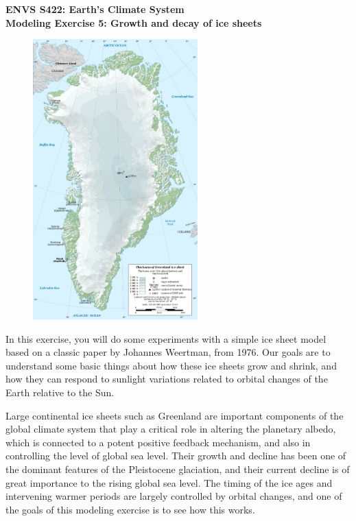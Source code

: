 \documentclass[11pt,letterpaper]{article}
\begin{document}
\setlength{\parindent}{0in}
\newcommand{\tablespace}[0]{\vspace{8pt}}
\textbf{ENVS S422: Earth's Climate System\\
Modeling Exercise 5: Growth and decay of ice sheets}\\%

\begin{figure}
\includegraphics[width=2.5in]{./greenland.png}
\end{figure}
In this exercise, you will do some experiments with a simple ice sheet model based on a classic paper by Johannes Weertman, from 1976. Our goals are to understand some basic things about how these ice sheets grow and shrink, and how they can respond to sunlight variations related to orbital changes of the Earth relative to the
Sun.


Large continental ice sheets such as Greenland are important components of the global climate system that play a critical role in altering the planetary albedo, which is connected to a potent positive feedback mechanism, and also in controlling the level of global sea level. Their growth and decline has been one of the dominant features of the Pleistocene glaciation, and their current decline is of great importance to the rising global sea level. The timing of the ice ages and intervening warmer periods are largely controlled by orbital changes, and one of the goals of this modeling exercise is to see how this works.
\end{document}
